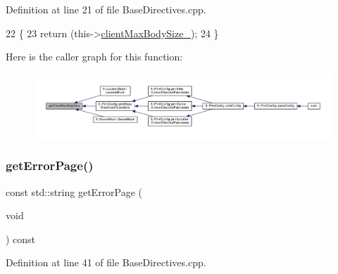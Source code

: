 Definition at line 21 of file Base\+Directives.\+cpp.


\begin{DoxyCode}
22     \{
23         \textcolor{keywordflow}{return} (this->\hyperlink{classft_1_1_base_directives_ad65c2594d2a90ca065d410dfd4066a19}{clientMaxBodySize\_});
24     \}
\end{DoxyCode}
Here is the caller graph for this function\+:
\nopagebreak
\begin{figure}[H]
\begin{center}
\leavevmode
\includegraphics[width=350pt]{classft_1_1_base_directives_a930398ba1e4b99b2ba01a60dcda0c923_icgraph}
\end{center}
\end{figure}
\mbox{\label{classft_1_1_base_directives_a3cb0c21f17781de392d5ee09d7190caf}} 
\subsubsection{\texorpdfstring{get\+Error\+Page()}{getErrorPage()}}
{\footnotesize\ttfamily const std\+::string get\+Error\+Page (\begin{DoxyParamCaption}\item[{void}]{ }\end{DoxyParamCaption}) const\hspace{0.3cm}{\ttfamily [inherited]}}



Definition at line 41 of file Base\+Directives.\+cpp.


